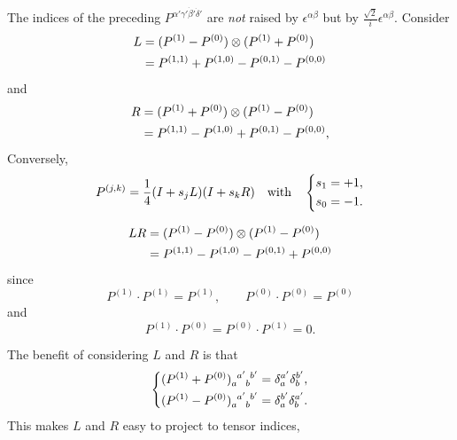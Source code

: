 The indices of the preceding $P^{\alpha' \gamma' \dot\beta' \dot\delta'}$ are \emph{not} raised by $\epsilon^{\alpha \beta}$ but by $\frac{\sqrt{2}}{i} \epsilon^{\alpha \beta}$.
Consider
\begin{align}
    L & = (P^{(1)} - P^{(0)}) \otimes (P^{(1)} + P^{(0)}) \notag \\
    & = P^{(1, 1)} + P^{(1, 0)} - P^{(0, 1)} - P^{(0, 0)}
\end{align}
and
\begin{align}
    R & = (P^{(1)} + P^{(0)}) \otimes (P^{(1)} - P^{(0)}) \notag \\
    & = P^{(1, 1)} - P^{(1, 0)} + P^{(0, 1)} - P^{(0, 0)},
\end{align}
Conversely,
\begin{equation}
    P^{(j, k)} = \frac{1}{4} (I + s_j L) (I + s_k R) \quad \text{with} \quad
    \begin{dcases}
        s_1 = + 1, \\
        s_0 = - 1.
    \end{dcases}
\end{equation}
\begin{framed}
    \begin{align}
        L R & = (P^{(1)} - P^{(0)}) \otimes (P^{(1)} - P^{(0)}) \notag \\
        & = P^{(1, 1)} - P^{(1, 0)} - P^{(0, 1)} + P^{(0, 0)}
    \end{align}
    since
    \begin{equation}
        P^{(1)} \cdot P^{(1)} = P^{(1)}, \qquad P^{(0)} \cdot P^{(0)} = P^{(0)}
    \end{equation}
    and
    \begin{equation}
        P^{(1)} \cdot P^{(0)} = P^{(0)} \cdot P^{(1)} = 0.
    \end{equation}
\end{framed}
The benefit of considering $L$ and $R$ is that
\begin{equation}
    \begin{dcases}
        \tensor{(P^{(1)} + P^{(0)})}{_a^{a'}_b^{b'}} = \delta_a^{a'} \delta_b^{b'}, \\
        \tensor{(P^{(1)} - P^{(0)})}{_a^{a'}_b^{b'}} = \delta_a^{b'} \delta_b^{a'}.
    \end{dcases}
\end{equation}
This makes $L$ and $R$ easy to project to tensor indices,
